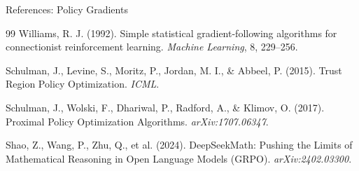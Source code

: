 \begin{frame}{References: Policy Gradients}
    \begin{thebibliography}{99}
            Williams, R. J. (1992). Simple statistical gradient-following algorithms for connectionist reinforcement learning. \emph{Machine Learning}, 8, 229--256.

            Schulman, J., Levine, S., Moritz, P., Jordan, M. I., \& Abbeel, P. (2015). Trust Region Policy Optimization. \emph{ICML}.

            Schulman, J., Wolski, F., Dhariwal, P., Radford, A., \& Klimov, O. (2017). Proximal Policy Optimization Algorithms. \emph{arXiv:1707.06347}.

            Shao, Z., Wang, P., Zhu, Q., et al. (2024). DeepSeekMath: Pushing the Limits of Mathematical Reasoning in Open Language Models (GRPO). \emph{arXiv:2402.03300}.
    \end{thebibliography}
\end{frame}
